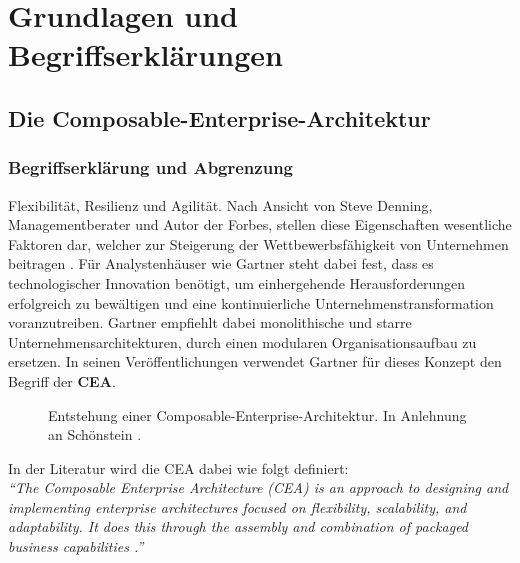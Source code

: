 \section{Grundlagen und Begriffserklärungen}

\subsection{Die Composable-Enterprise-Architektur}

\subsubsection{Begriffserklärung und Abgrenzung}
\label{sec:CEA_B}
Flexibilität, Resilienz und Agilität. Nach Ansicht von Steve Denning, Managementberater und Autor der Forbes, stellen diese Eigenschaften wesentliche Faktoren dar, welcher zur Steigerung der Wettbewerbsfähigkeit von Unternehmen beitragen \cite{Denning.20170210}. Für Analystenhäuser wie Gartner steht dabei fest, dass es technologischer Innovation benötigt, um einhergehende Herausforderungen erfolgreich zu bewältigen und eine kontinuierliche Unternehmenstransformation voranzutreiben. Gartner empfiehlt dabei monolithische und starre Unternehmensarchitekturen, durch einen modularen Organisationsaufbau zu ersetzen. In seinen Veröffentlichungen verwendet Gartner für dieses Konzept den Begriff der \textbf{\ac{CEA}}.
\begin{center}
	\begin{figure}[H]
		\centering
		\caption[Entstehung einer Composable-Enterprise-Architektur]{Entstehung einer Composable-Enterprise-Architektur. In Anlehnung an Schönstein \cite{Schonenstein.20230103}.}
		\label{fig:CEA_S}
	\end{figure}	
\end{center}
\vspace*{-15mm}
In der Literatur wird die CEA dabei wie folgt definiert:\vspace{2mm}\\
\textit{\enquote{The Composable Enterprise Architecture (CEA) is an approach to designing and implementing enterprise architectures focused on flexibility, scalability, and adaptability. It does this through the assembly and combination of packaged business capabilities \cite{Gartner.20230418}.}}\vspace{2mm}\\
